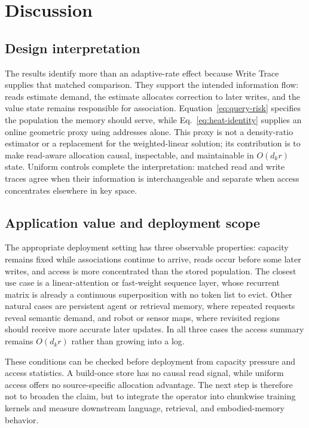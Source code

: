 \documentclass[pdflatex,sn-mathphys-num]{sn-jnl}
\theoremstyle{thmstyleone}
\begin{document}
\section{Discussion}\label{sec:discussion}

\subsection{Design interpretation}

The results identify more than an adaptive-rate effect because Write Trace supplies that matched comparison. They support the intended information flow: reads estimate demand, the estimate allocates correction to later writes, and the value state remains responsible for association. Equation~\eqref{eq:query-risk} specifies the population the memory should serve, while Eq.~\eqref{eq:heat-identity} supplies an online geometric proxy using addresses alone. This proxy is not a density-ratio estimator or a replacement for the weighted-linear solution; its contribution is to make read-aware allocation causal, inspectable, and maintainable in $O(d_kr)$ state. Uniform controls complete the interpretation: matched read and write traces agree when their information is interchangeable and separate when access concentrates elsewhere in key space.

\subsection{Application value and deployment scope}

The appropriate deployment setting has three observable properties: capacity remains fixed while associations continue to arrive, reads occur before some later writes, and access is more concentrated than the stored population. The closest use case is a linear-attention or fast-weight sequence layer, whose recurrent matrix is already a continuous superposition with no token list to evict. Other natural cases are persistent agent or retrieval memory, where repeated requests reveal semantic demand, and robot or sensor maps, where revisited regions should receive more accurate later updates. In all three cases the access summary remains $O(d_kr)$ rather than growing into a log.

These conditions can be checked before deployment from capacity pressure and access statistics. A build-once store has no causal read signal, while uniform access offers no source-specific allocation advantage. The next step is therefore not to broaden the claim, but to integrate the operator into chunkwise training kernels and measure downstream language, retrieval, and embodied-memory behavior.
\end{document}
